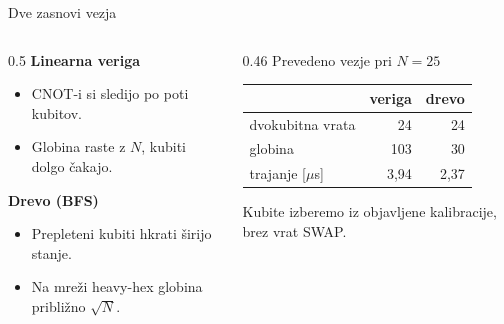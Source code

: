 \documentclass[aspectratio=169,11pt]{beamer}
\begin{document}
\begin{frame}{Dve zasnovi vezja}
\begin{columns}[T]
\begin{column}{0.5\textwidth}
\textbf{Linearna veriga}
\begin{itemize}
\item CNOT-i si sledijo po poti kubitov.
\item Globina raste z $N$, kubiti dolgo čakajo.
\end{itemize}
\medskip
\textbf{Drevo (BFS)}
\begin{itemize}
\item Prepleteni kubiti hkrati širijo stanje.
\item Na mreži heavy-hex globina približno $\sqrt{N}$.
\end{itemize}
\end{column}
\begin{column}{0.46\textwidth}
\centering
Prevedeno vezje pri $N=25$\par\medskip
\begin{tabular}{lrr}
\toprule
 & veriga & drevo \\
\midrule
dvokubitna vrata & 24 & 24 \\
globina & 103 & 30 \\
trajanje [$\mu$s] & 3,94 & 2,37 \\
\bottomrule
\end{tabular}
\par\bigskip
\small Kubite izberemo iz objavljene kalibracije, brez vrat SWAP.
\end{column}
\end{columns}
\end{frame}
\end{document}
